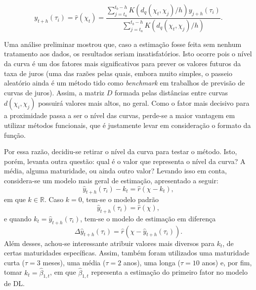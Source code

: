 \documentclass[
	12pt,				%
	openright,			%
	oneside,			%
	a4paper,			%
	english,			%
	brazil				%
	]{dissertacao-ufrgs-abntex2}
\begin{document}
\begin{equation}
y_{t+h}(\tau_i)=\hat{r}(\chi_t) = 
\frac
	{\sum \limits_{j=t_a}^{t_b-h} K(d_{q}(\chi_t,\chi_j)/h)y_{j+h}(\tau_i)}
	{\sum \limits_{j=t_a}^{t_b-h}K(d_{q}(\chi_t,\chi_j)/h)}.
\end{equation}


Uma análise preliminar mostrou que, caso a estimação fosse feita sem nenhum tratamento aos dados, os resultados seriam insatisfatórios. Isto ocorre pois o nível da curva é um dos fatores mais significativos para prever os valores futuros da taxa de juros (uma das razões pelas quais, embora muito simples, o passeio aleatório ainda é um método tido como \emph{benchmark} em trabalhos de previsão de curvas de juros). Assim, a matriz $D$ formada pelas distâncias entre curvas $d(\chi_i,\chi_j)$ possuirá valores mais altos, no geral. Como o fator mais decisivo para a proximidade passa a ser o nível das curvas, perde-se a maior vantagem em utilizar métodos funcionais, que é justamente levar em consideração o formato da função.

Por essa razão, decidiu-se retirar o nível da curva para testar o método. Isto, porém, levanta outra questão: qual é o valor que representa o nível da curva? A média, alguma maturidade, ou ainda outro valor? Levando isso em conta, considera-se um modelo mais geral de estimação, apresentado a seguir:
\begin{equation}
\hat{y}_{t+h}(\tau_i) - k_t = \hat{r}(\chi - k_t),
\end{equation}
em que $k \in \mathbb{R}$. Caso $k=0$, tem-se o modelo padrão
\begin{equation}
\hat{y}_{t+h}(\tau_i) = \hat{r}(\chi),
\end{equation}
e quando $k_t = \hat{y}_{t+h}(\tau_i)$, tem-se o modelo de estimação em diferença
\begin{equation}
\Delta \hat{y}_{t+h}(\tau_i)= \hat{r}(\chi - \hat{y}_{t+h}(\tau_i)).
\end{equation}
Além desses, achou-se interessante atribuir valores mais diversos para $k_t$, de certas maturidades específicas. Assim, também foram utilizados uma maturidade curta ($\tau = 3$ meses), uma média ($\tau = 2$ anos), uma longa ($\tau = 10$ anos) e, por fim, tomar $k_t = \hat{\beta}_{1,t}$, em que $\hat{\beta}_{1,t}$ representa a estimação do primeiro fator no modelo de DL. 
\end{document}
